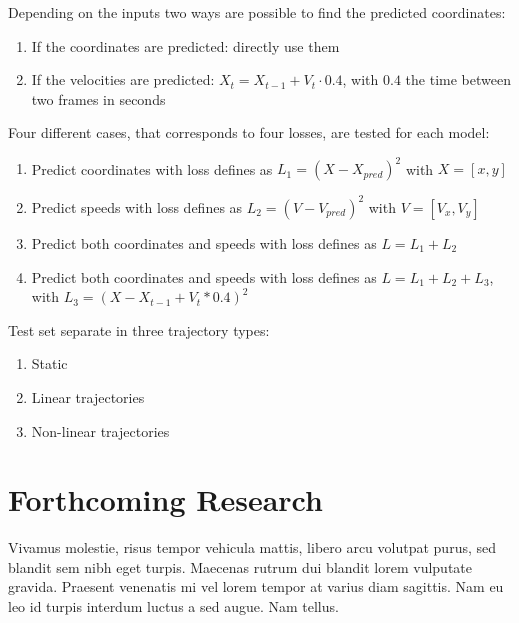 \documentclass[a0,portrait]{a0poster}
\begin{document}
\begin{multicols}{2}
Depending on the inputs two ways are possible to find the predicted coordinates:\\
\begin{enumerate}
\justifying
\item If the coordinates are predicted: directly use them
\item If the velocities are predicted: $X_{t} = X_{t-1} + V_{t}\cdot 0.4$, with $0.4$ the time between two frames in seconds
\end{enumerate}

Four different cases, that corresponds to four losses, are tested for each model:
\begin{enumerate}
\justifying
\item Predict coordinates with loss defines as $L_1 = (X-X_{pred})^2$ with $X = [x,y]$
\item Predict speeds with loss defines as $L_2 = (V-V_{pred})^2$ with $V = [V_x,V_y]$ 
\item Predict both coordinates and speeds with loss defines as $L = L_1 + L_2$
\item Predict both coordinates and speeds with loss defines as $L = L_1 + L_2 + L_3 $, with $L_3 = (X- X_{t-1} + V_t*0.4)^2$
\end{enumerate}
\vspace{0.3cm}
Test set separate in three trajectory types:\\
\begin{enumerate}
\justifying
\item Static
\item Linear trajectories
\item Non-linear trajectories
\end{enumerate}

\section*{Forthcoming Research}

Vivamus molestie, risus tempor vehicula mattis, libero arcu volutpat purus, sed blandit sem nibh eget turpis. Maecenas rutrum dui blandit lorem vulputate gravida. Praesent venenatis mi vel lorem tempor at varius diam sagittis. Nam eu leo id turpis interdum luctus a sed augue. Nam tellus.



\end{multicols}
\end{document}
